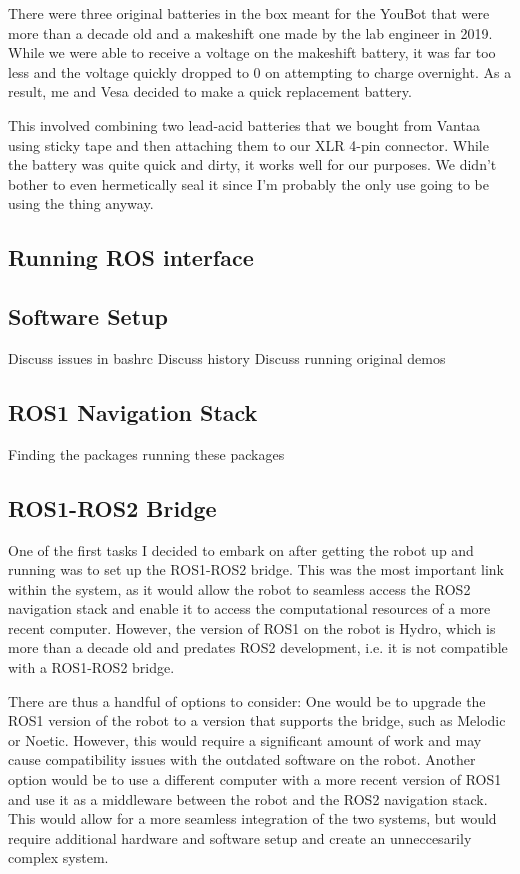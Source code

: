 \documentclass[a4paper, 12pt]{article}
\begin{document}
    There were three original batteries in the box meant for the YouBot that were more than a decade old and a makeshift one made by the lab engineer in 2019. While we were able to receive a voltage on the makeshift battery, it was far too less and the voltage quickly dropped to 0 on attempting to charge overnight. As a result, me and Vesa decided to make a quick replacement battery.

    This involved combining two lead-acid batteries that we bought from Vantaa using sticky tape and then attaching them to our XLR 4-pin connector. While the battery was quite quick and dirty, it works well for our purposes. We didn't bother to even hermetically seal it since I'm probably the only use going to be using the thing anyway. 

    \subsection{Running ROS interface}
    
    \subsection{Software Setup}

    Discuss issues in bashrc
    Discuss history 
    Discuss running original demos


    \subsection{ROS1 Navigation Stack}

    Finding the packages
    running these packages

    \subsection{ROS1-ROS2 Bridge}

    One of the first tasks I decided to embark on after getting the robot up and running was to set up the ROS1-ROS2 bridge. This was the most important link within the system, as it would allow the robot to seamless access the ROS2 navigation stack and enable it to access the computational resources of a more recent computer. However, the version of ROS1 on the robot is Hydro, which is more than a decade old and predates ROS2 development, i.e. it is not compatible with a ROS1-ROS2 bridge. 

    There are thus a handful of options to consider: One would be to upgrade the ROS1 version of the robot to a version that supports the bridge, such as Melodic or Noetic. However, this would require a significant amount of work and may cause compatibility issues with the outdated software on the robot. Another option would be to use a different computer with a more recent version of ROS1 and use it as a middleware between the robot and the ROS2 navigation stack. This would allow for a more seamless integration of the two systems, but would require additional hardware and software setup and create an unneccesarily complex system. 
\end{document}
